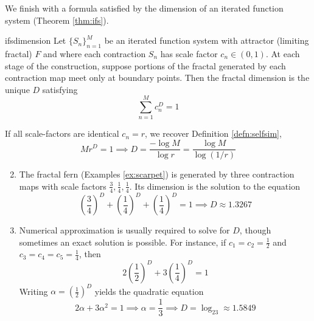 \goodbreak

We finish with a formula satisfied by the dimension of an iterated function system (Theorem \ref{thm:ifs}).

\begin{thm}{}{ifsdimension}
Let $\{S_n\}_{n=1}^M$ be an iterated function system with attractor (limiting fractal) $F$ and where each contraction $S_n$ has scale factor $c_n\in(0,1)$. At each stage of the construction, suppose portions of the fractal generated by each contraction map meet only at boundary points. Then the fractal dimension is the unique $D$ satisfying
\[\sum_{n=1}^Mc_n^D=1\]
\end{thm}

\begin{examples}{}{}
\exstart If all scale-factors are identical $c_n=r$, we recover Definition \ref{defn:selfsim},
\[Mr^D=1\implies D=\frac{-\log M}{\log r}=\frac{\log M}{\log (1/r)}\]
\begin{enumerate}\setcounter{enumi}{1}
  \item The fractal fern (Examples \ref{ex:scarpet}) is generated by three contraction maps with scale factors $\frac 34,\frac 14,\frac 14$. Its dimension is the solution to the equation
  \[\left(\frac 34\right)^D+\left(\frac 14\right)^D+\left(\frac 14\right)^D=1\implies D\approx 1.3267\]
  \item Numerical approximation is usually required to solve for $D$, though sometimes an exact solution is possible. For instance, if $c_1=c_2=\frac 12$ and $c_3=c_4=c_5=\frac 14$, then
  \[2\left(\frac 12\right)^D+3\left(\frac 14\right)^D=1\]
  Writing $\alpha=\left(\frac 12\right)^D$ yields the quadratic equation
  \[2\alpha+3\alpha^2=1\implies \alpha=\frac 13\implies D=\log_23\approx 1.5849\]
\end{enumerate}
\end{examples}


